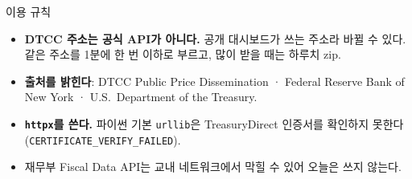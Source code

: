 \documentclass[aspectratio=169,10pt]{beamer}
\begin{document}
\begin{frame}{이용 규칙}
\begin{itemize}\setlength\itemsep{8pt}
\item \textbf{DTCC 주소는 공식 API가 아니다.} 공개 대시보드가 쓰는 주소라 바뀔 수 있다. 같은 주소를 1분에 한 번 이하로 부르고, 많이 받을 때는 하루치 zip.
\item \textbf{출처를 밝힌다}: DTCC Public Price Dissemination · Federal Reserve Bank of New York · U.S.\ Department of the Treasury.
\item \textbf{\texttt{httpx}를 쓴다.} 파이썬 기본 \texttt{urllib}은 TreasuryDirect 인증서를 확인하지 못한다 (\texttt{CERTIFICATE\_VERIFY\_FAILED}).
\item 재무부 Fiscal Data API는 교내 네트워크에서 막힐 수 있어 오늘은 쓰지 않는다.
\end{itemize}
\end{frame}
\end{document}
